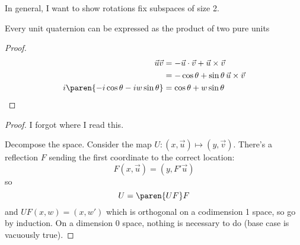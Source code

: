 \documentclass{scrartcl}
\begin{document}
\begin{multicols*}{2}
  In general, I want to show rotations fix subspaces of size 2.

  \begin{theorem}
    Every unit quaternion can be expressed as the product of two pure units
  \end{theorem}
  \begin{proof}
    \begin{align*}
      \vec u \vec v &= -\vec u \cdot \vec v + \vec u \times \vec v \\
                    &= -\cos\theta + \sin\theta \,\vec u\times\vec v \\
      i \paren{-i \cos \theta  - iw\sin\theta} &= \cos\theta + w\sin\theta
    \end{align*}
  \end{proof}

  \begin{theorem}
  \end{theorem}
  \begin{proof}
    I forgot where I read this.

    Decompose the space. Consider the map \(U:(x,\vec u) \mapsto (y,\vec v)\). There's a reflection \(F\) sending the first coordinate to the correct location:
    \[
      F(x,\vec u) = (y, F' \vec u)
    \]
    so
    \[
      U = \paren{UF} F
    \]
    and \(UF(x,w) = (x,w')\) which is orthogonal on a codimension 1 space, so go by induction. On a dimension 0 space, nothing is necessary to do (base case is vacuously true).
  \end{proof}


\end{multicols*}
\end{document}

